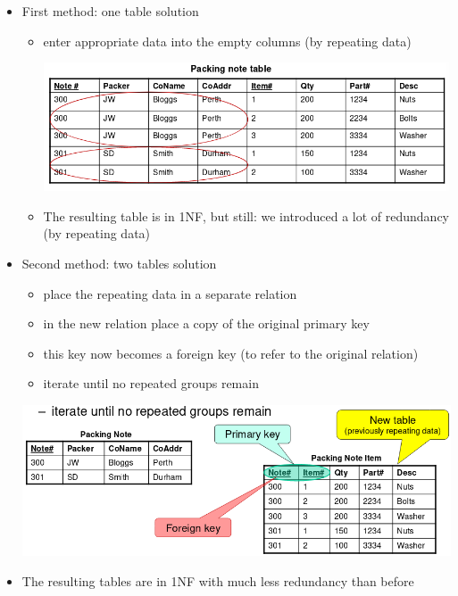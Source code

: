 \documentclass{article}[18pt]
\begin{document}
\begin{itemize}
	\item First method: one table solution
	\begin{itemize}
		\item enter appropriate data into the empty columns (by repeating data)
		\begin{center}
			\includegraphics[scale=0.7]{1NF}
		\end{center}
		\item The resulting table is in 1NF, but still: we introduced a lot of redundancy (by repeating data)
	\end{itemize}
	\item Second method: two tables solution
	\begin{itemize}
		\item place the repeating data in a separate relation
		\item in the new relation place a copy of the original primary key
		\item this key now becomes a foreign key (to refer to the original relation)
		\item iterate until no repeated groups remain
	\end{itemize}
\begin{center}
	\includegraphics[scale=0.7]{1NF1}
\end{center}
	\item The resulting tables are in 1NF with much less redundancy than before
\end{itemize}
\end{document}
